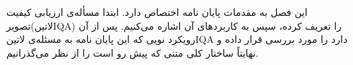 این فصل به مقدمات پایان نامه اختصاص دارد. ابتدا مسأله‌ی ارزیابی کیفیت تصویر(‌لاتین{IQA}) را تعریف کرده، سپس به کاربردهای آن اشاره می‌کنیم. پس از آن رویکرد نویی که این پایان نامه به مسئله‌ی ‌لاتین{IQA} دارد را مورد بررسی قرار داده و نهایتاً ساختار کلی متنی که پیش رو است را از نظر می‌گذرانیم.

\begin{comment}
\begin{figure}[ht]
  \centering
  \texttt{[image: harmonized.pdf]}
  \شرح{شرح \متن‌لاتین{harmonized.pdf} \مرجع{someCitation}}
  \label{شکل:دسته‌های‌IQA}
\end{figure}
\end{comment}
